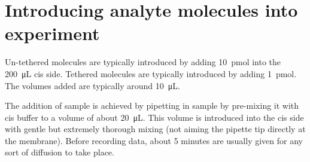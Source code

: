 \section{Introducing analyte molecules into experiment}

Un-tethered molecules are typically introduced by adding \SI{10}{\pico\mol} into the \SI{200}{\micro\liter} cis side.  Tethered molecules are typically introduced by adding \SI{1}{\pico\mol}.  The volumes added are typically around \SI{10}{\micro\liter}.

The addition of sample is achieved by pipetting in sample by pre-mixing it with cis buffer to a volume of about \SI{20}{\micro\liter}.  This volume is introduced into the cis side with gentle but extremely thorough mixing (not aiming the pipette tip directly at the membrane).  Before recording data, about \num{5} minutes are usually given for any sort of diffusion to take place.
